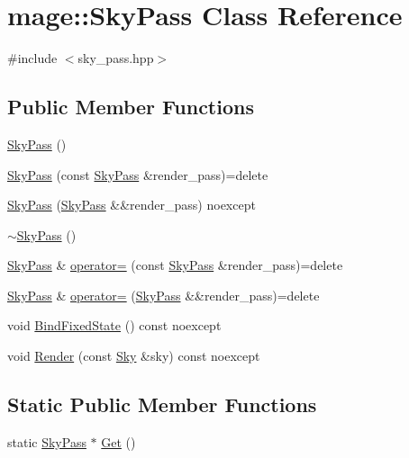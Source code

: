 \hypertarget{classmage_1_1_sky_pass}{}\section{mage\+:\+:Sky\+Pass Class Reference}
\label{classmage_1_1_sky_pass}


{\ttfamily \#include $<$sky\+\_\+pass.\+hpp$>$}

\subsection*{Public Member Functions}
\begin{DoxyCompactItemize}
\item 
\hyperlink{classmage_1_1_sky_pass_a41bb9d2d37f2c3a7bc5b12cffad9dafa}{Sky\+Pass} ()
\item 
\hyperlink{classmage_1_1_sky_pass_a78be688fecb0a4f55df78d4af01c4590}{Sky\+Pass} (const \hyperlink{classmage_1_1_sky_pass}{Sky\+Pass} \&render\+\_\+pass)=delete
\item 
\hyperlink{classmage_1_1_sky_pass_a86acd9fdb50c3c92a6c15632362aea47}{Sky\+Pass} (\hyperlink{classmage_1_1_sky_pass}{Sky\+Pass} \&\&render\+\_\+pass) noexcept
\item 
\hyperlink{classmage_1_1_sky_pass_ab3e581e2eedfc62e13c71d91359f71ce}{$\sim$\+Sky\+Pass} ()
\item 
\hyperlink{classmage_1_1_sky_pass}{Sky\+Pass} \& \hyperlink{classmage_1_1_sky_pass_acfb9531772b437603825e43d17f4d983}{operator=} (const \hyperlink{classmage_1_1_sky_pass}{Sky\+Pass} \&render\+\_\+pass)=delete
\item 
\hyperlink{classmage_1_1_sky_pass}{Sky\+Pass} \& \hyperlink{classmage_1_1_sky_pass_ae15ed24b3bbf4008b90e4cfcb4117a84}{operator=} (\hyperlink{classmage_1_1_sky_pass}{Sky\+Pass} \&\&render\+\_\+pass)=delete
\item 
void \hyperlink{classmage_1_1_sky_pass_aa74c5e32a917aac610b2c7e4750c4639}{Bind\+Fixed\+State} () const noexcept
\item 
void \hyperlink{classmage_1_1_sky_pass_a832e22543e9de25e316dd03d96ccf34b}{Render} (const \hyperlink{classmage_1_1_sky}{Sky} \&sky) const noexcept
\end{DoxyCompactItemize}
\subsection*{Static Public Member Functions}
\begin{DoxyCompactItemize}
\item 
static \hyperlink{classmage_1_1_sky_pass}{Sky\+Pass} $\ast$ \hyperlink{classmage_1_1_sky_pass_af608935f6cb4b631512ee9c9eb6dec9d}{Get} ()
\end{DoxyCompactItemize}
